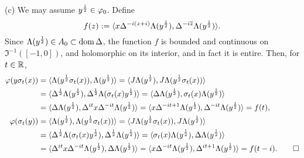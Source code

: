 \documentclass{../../small}
\begin{document}
\begin{pf}
(c)
We may assume $y^{\frac12}\in\varphi_0$.
Define
\[f(z):=\langle x\Delta^{-i(z+i)}\Lambda(y^{\frac12}),\Delta^{-i\overline z}\Lambda(y^{\frac12})\rangle.\]
Since $\Lambda(y^{\frac12})\in A_0\subset\operatorname{dom}\Delta$, the function $f$ is bounded and continuous on $\Im^{-1}([-1,0])$, and holomorphic on its interior, and in fact it is entire.
Then, for $t\in\mathbb{R}$,
\begin{align*}
\varphi(y\sigma_t(x))
&=\langle\Lambda(y^{\frac12}\sigma_t(x)),\Lambda(y^{\frac12})\rangle
=\langle J\Lambda(y^{\frac12}),J\Lambda(y^{\frac12}\sigma_t(x))\rangle\\
&=\langle\Delta^{\frac12}\Lambda(y^{\frac12}),\Delta^{\frac12}\Lambda(\sigma_t(x)y^{\frac12})\rangle
=\langle\Delta\Lambda(y^{\frac12}),\sigma_t(x)\Lambda(y^{\frac12})\rangle\\
&=\langle\Delta\Lambda(y^{\frac12}),\Delta^{it}x\Delta^{-it}\Lambda(y^{\frac12})\rangle
=\langle x\Delta^{-it+1}\Lambda(y^{\frac12}),\Delta^{-it}\Lambda(y^{\frac12})\rangle
=f(t),\\
\varphi(\sigma_t(y))
&=\langle\Lambda(y^{\frac12}),\Lambda(y^{\frac12}\sigma_t(x))\rangle
=\langle J\Lambda(y^{\frac12}\sigma_t(x)),J\Lambda(y^{\frac12})\rangle\\
&=\langle\Delta^{\frac12}\Lambda(\sigma_t(x)y^{\frac12}),\Delta^{\frac12}\Lambda(y^{\frac12})\rangle
=\langle\sigma_t(x)\Lambda(y^{\frac12}),\Delta\Lambda(y^{\frac12})\rangle\\
&=\langle\Delta^{it}x\Delta^{-it}\Lambda(y^{\frac12}),\Delta\Lambda(y^{\frac12})\rangle
=\langle x\Delta^{-it}\Lambda(y^{\frac12}),\Delta^{it+1}\Lambda(y^{\frac12})\rangle
=f(t-i).\qedhere
\end{align*}
\end{pf}
\end{document}
